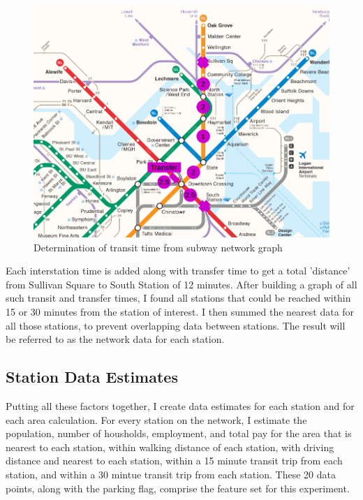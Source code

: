 \documentclass{article}
\begin{document}
\begin{figure}\label{fig:f4}
\begin{center}\includegraphics[scale=0.6]{transfer_with_markup}\end{center}
\caption{Determination of transit time from subway network graph}
\end{figure}

Each interstation time is added along with transfer time to get a total 'distance' from Sullivan Square to South Station of 12 minutes. After building a graph of all such transit and transfer times, I found all stations that could be reached within 15 or 30 minutes from the station of interest. I then summed the nearest data for all those stations, to prevent overlapping data between stations. The result will be referred to as the network data for each station. 

\subsection{Station Data Estimates}

Putting all these factors together, I create data estimates for each station and for each area calculation. For every station on the network, I estimate the population, number of housholds, employment, and total pay for the area that is nearest to each station, within walking distance of each station, with driving distance and nearest to each station, within a 15 minute transit trip from each station, and within a 30 mintue transit trip from each station. These 20 data points, along with the parking flag, comprise the feature set for this experiment.
\end{document}

